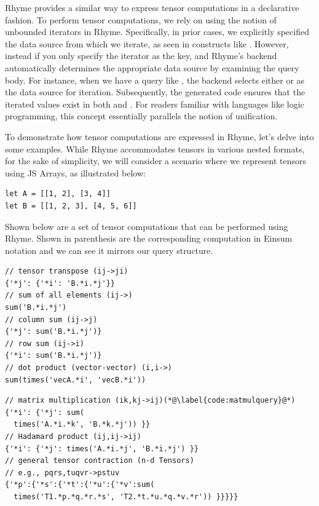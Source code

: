 \documentclass[runningheads]{llncs}
\newcommand{\lang}{Rhyme}
\begin{document}
\lang{} provides a similar way to express tensor computations in a declarative fashion.
To perform tensor computations, we rely on using the notion of unbounded iterators in \lang{}.
Specifically, in prior cases, we explicitly specified the data source from which we iterate,
as seen in constructs like .
However, instead if you only specify the iterator as the key, and \lang{}'s backend
automatically determines the appropriate data source by examining the query body.
For instance, when we have a query like , the
backend selects either  or  as the data source for iteration.
Subsequently, the generated code ensures that the iterated values exist in
both  and .
For readers familiar with languages like logic programming, this concept essentially
parallels the notion of unification.

To demonstrate how tensor computations are expressed in \lang{}, let's delve into
some examples.
While \lang{} accommodates tensors in various nested formats, for the sake of simplicity,
we will consider a scenario where we represent tensors using JS Arrays, as illustrated below:
\begin{lstlisting}[style=JavaScript,columns=flexible]
let A = [[1, 2], [3, 4]]
let B = [[1, 2, 3], [4, 5, 6]]
\end{lstlisting}

Shown below are a set of tensor computations that can be performed using \lang{}.
Shown in parenthesis are the corresponding computation in Einsum notation
and we can see it mirrors our query structure.

\hspace{-18pt}
\begin{minipage}{0.5\textwidth}
\begin{lstlisting}[style=JavaScript,columns=flexible]
// tensor transpose (ij->ji)
{'*j': {'*i': 'B.*i.*j'}}
// sum of all elements (ij->)
sum('B.*i.*j')
// column sum (ij->j)
{'*j': sum('B.*i.*j')}
// row sum (ij->i)
{'*i': sum('B.*i.*j')}
// dot product (vector-vector) (i,i->)
sum(times('vecA.*i', 'vecB.*i'))
\end{lstlisting}
\end{minipage}%
\begin{minipage}{0.5\textwidth}
\begin{lstlisting}[style=JavaScript,columns=flexible]
// matrix multiplication (ik,kj->ij)(*@\label{code:matmulquery}@*)
{'*i': {'*j': sum(
  times('A.*i.*k', 'B.*k.*j')) }}
// Hadamard product (ij,ij->ij)
{'*i': {'*j': times('A.*i.*j', 'B.*i.*j') }}
// general tensor contraction (n-d Tensors)
// e.g., pqrs,tuqvr->pstuv
{'*p':{'*s':{'*t':{'*u':{'*v':sum(
  times('T1.*p.*q.*r.*s', 'T2.*t.*u.*q.*v.*r')) }}}}}
\end{lstlisting}
\end{minipage}
\end{document}

